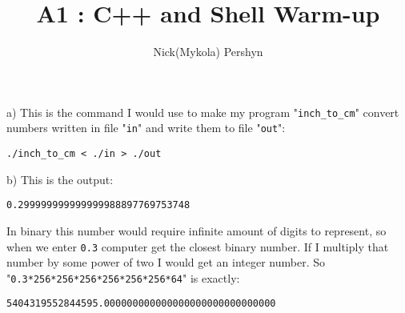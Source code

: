 
\title{A1 : C++ and Shell Warm-up}
\author{Nick(Mykola) Pershyn}


\maketitle{}
a) This is the command I would use to make my program "\texttt{inch\_to\_cm}" convert numbers written in file "\texttt{in}" and write them to file "\texttt{out}":

\begin{verbatim}
./inch_to_cm < ./in > ./out
\end{verbatim}

b) This is the output:
\begin{verbatim}
0.299999999999999988897769753748
\end{verbatim}

In binary this number would require infinite amount of digits to represent, so when we enter \texttt{0.3} computer get the closest binary number. If I multiply that number by some power of two I would get an integer number.
So "\texttt{0.3*256*256*256*256*256*256*64}" is exactly:
\begin{verbatim}
5404319552844595.000000000000000000000000000000
\end{verbatim}

 
